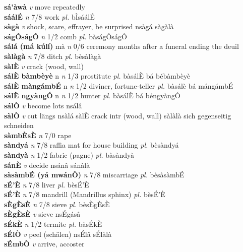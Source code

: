 \documentclass{article}
\begin{document}
{\bf sá'àwà}  {\it v} move repeatedly         \\ 
{\bf sáálÉ}  {\it n} 7/8 work {\it pl.} bÌsáálÉ         \\ 
{\bf sàgà}  {\it v} shock, scare, effrayer, be surprised   nsàgá   sàgàlà   \\ 
{\bf ságÓságÓ}  {\it n} 1/2 comb {\it pl.} bàságÓságÓ         \\ 
{\bf sálá (má kúlí)} mà {\it n} 0/6 ceremony months after a funeral ending the deuil         \\ 
{\bf sàlàgà}  {\it n} 7/8 ditch {\it pl.} bèsàlàgà         \\ 
{\bf sàlÈ}  {\it v} crack (wood, wall)         \\ 
{\bf sálÈ bàmbèyè} n {\it n} 1/3 prostitute {\it pl.} bàsálÈ bá bébàmbèyè         \\ 
{\bf sálÈ màngámbÉ} n {\it n} 1/2 diviner, fortune-teller {\it pl.} bàsálè bá mángámbÉ         \\ 
{\bf sálÈ ngyàngÓ} n {\it n} 1/2 hunter {\it pl.} bàsálÈ bá béngyàngÓ         \\ 
{\bf sálÒ}  {\it v} become lots   nsálâ      \\ 
{\bf sàlÒ}  {\it v} cut längs   nsàlá sàlÈ crack intr (wood, wall)  sàlàlà sich gegenseitig schneiden   \\ 
{\bf sàmbÈsÈ}  {\it n} 7/0 rape         \\ 
{\bf sàndyá}  {\it n} 7/8 raffia mat for house building {\it pl.} bèsàndyá         \\ 
{\bf sàndyà}  {\it n} 1/2 fabric (pagne) {\it pl.} bàsàndyà         \\ 
{\bf sánÈ}  {\it v} decide   nsánâ   sánàlà   \\ 
{\bf sàsàmbÉ (yá mwánÒ)}  {\it n} 7/8 miscarriage {\it pl.} bèsàsàmbÉ         \\ 
{\bf sÉ'È}  {\it n} 7/8 liver {\it pl.} bèsÉ'È         \\ 
{\bf sÉ'È}  {\it n} 7/8 mandrill (Mandrillus sphinx) {\it pl.} bèsÉ'È         \\ 
{\bf sÈgÈsÈ}  {\it n} 7/8 sieve {\it pl.} bèsÈgÈsÈ         \\ 
{\bf sÈgÈsÈ}  {\it v} sieve   nsÉgásâ      \\ 
{\bf sÉkÈ}  {\it n} 1/2 termite {\it pl.} bàsÉkÈ         \\ 
{\bf sÉlÒ}  {\it v} peel (schälen)   nsÉlâ   sÉlàlà   \\ 
{\bf sÉmbÒ}  {\it v} arrive, accoster         \\ 
\end{document}
